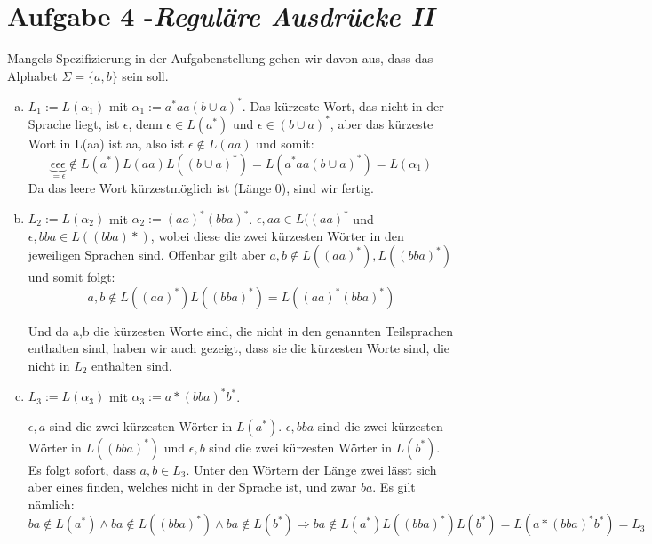 \documentclass{article}
\begin{document}
	\section*{Aufgabe 4 -\textit{Reguläre Ausdrücke II}}
	Mangels Spezifizierung in der Aufgabenstellung gehen wir davon aus, dass das Alphabet $\Sigma = \{a,b\}$ sein soll.
	\begin{enumerate}[a)]
		\item $L_1 := L(\alpha_1)$ mit $\alpha_1 := a^*aa(b \cup a)^*$. 
		Das kürzeste Wort, das nicht in der Sprache liegt, ist $\epsilon$, denn $\epsilon \in L(a^*)$ und $\epsilon \in (b \cup a)^*$, aber das kürzeste Wort in L(aa) ist aa, also ist $\epsilon \not\in L(aa)$ und somit:
		\begin{equation}
		\underbrace{\epsilon\epsilon\epsilon}_{=\epsilon} \not\in L(a^*)L(aa)L((b \cup a)^*) = L(a^*aa(b \cup a)^*) = L(\alpha_1)
		\end{equation}
		Da das leere Wort kürzestmöglich ist (Länge 0), sind wir fertig.
		
		\item $L_2 := L(\alpha_2)$ mit $\alpha_2 := (aa)^*(bba)^*$.
		$\epsilon,aa \in L((aa)^*$ und $\epsilon,bba\in L((bba)*)$, wobei diese die zwei kürzesten Wörter in den jeweiligen Sprachen sind. Offenbar gilt aber $a,b \not \in L((aa)^*), L((bba)^*)$ und somit folgt:
		\begin{equation}
		a,b \not \in L((aa)^*)L((bba)^*) = L((aa)^*(bba)^*)
		\end{equation}
		
		Und da a,b die kürzesten Worte sind, die nicht in den genannten Teilsprachen enthalten sind, haben wir auch gezeigt, dass sie die kürzesten Worte sind, die nicht in $L_2$ enthalten sind.
		
		\item $L_3 := L(\alpha_3)$ mit $\alpha_3 := a*(bba)^*b^*$. 
		
		$\epsilon,a$ sind die zwei kürzesten Wörter in $L(a^*)$. $\epsilon, bba$ sind die zwei kürzesten Wörter in $L((bba)^*)$ und $\epsilon, b$ sind die zwei kürzesten Wörter in $L(b^*)$. Es folgt sofort, dass $a,b \in L_3$. Unter den Wörtern der Länge zwei lässt sich aber eines finden, welches nicht in der Sprache ist, und zwar $ba$. Es gilt nämlich:
		\begin{equation}
		ba \not\in L(a^*) \land ba \not\in L((bba)^*) \land ba \not \in L(b^*) \Rightarrow ba\not\in L(a^*)L((bba)^*) L(b^*) = L(a*(bba)^*b^*) = L_3
		\end{equation}
		

\end{enumerate}
\end{document}
